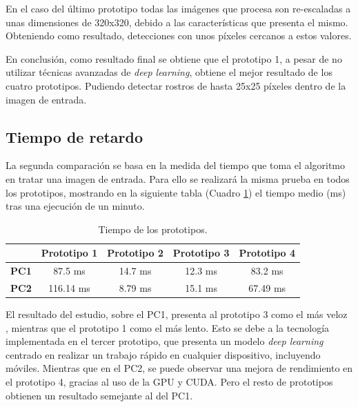 En el caso del último prototipo todas las imágenes que procesa son re-escaladas a unas dimensiones de 320x320, debido a las características que presenta el mismo. Obteniendo como resultado, detecciones con unos píxeles cercanos a estos valores.

En conclusión, como resultado final se obtiene que el prototipo 1, a pesar de no utilizar técnicas avanzadas de \textit{deep learning}, obtiene el mejor resultado de los cuatro prototipos. Pudiendo detectar rostros de hasta 25x25 píxeles dentro de la imagen de entrada.

\vspace{-0.5cm}
\subsection*{Tiempo de retardo}
\vspace{-0.5cm}

La segunda comparación se basa en la medida del tiempo que toma el algoritmo en tratar una imagen de entrada. Para ello se realizará la misma prueba en todos los prototipos, mostrando en la siguiente tabla (Cuadro \ref{tab:table4}) el tiempo medio (ms) tras una ejecución de un minuto.

\begin{table}[h!]
	\begin{center}
		\begin{tabular}{ |c|c|c|c|c| } 
			\hline
			& \textbf{Prototipo 1} & \textbf{Prototipo 2} & \textbf{Prototipo 3} & \textbf{Prototipo 4} \\
			\hline
			\textbf{PC1} & 87.5 ms & 14.7 ms  & 12.3 ms & 83.2 ms \\
			\hline
			\textbf{PC2} & 116.14 ms & 8.79 ms  & 15.1 ms & 67.49 ms \\
			\hline
		\end{tabular}
		\caption{Tiempo de los prototipos.}
		\label{tab:table4}
	\end{center}
\end{table}

El resultado del estudio, sobre el PC1, presenta al prototipo 3 como el más veloz , mientras que el prototipo 1 como el más lento. Esto se debe a la tecnología implementada en el tercer prototipo, que presenta un modelo \textit{deep learning} centrado en realizar un trabajo rápido en cualquier dispositivo, incluyendo móviles. Mientras que en el PC2, se puede observar una mejora de rendimiento en el prototipo 4, gracias al uso de la GPU y CUDA. Pero el resto de prototipos obtienen un resultado semejante al del PC1.

